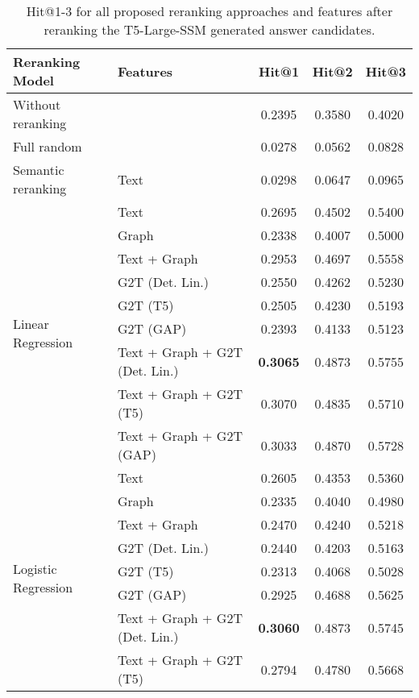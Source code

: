 \begin{table}[htbp]
    \caption{Hit@1-3 for all proposed reranking approaches and features after reranking the T5-Large-SSM generated answer candidates.}
    \label{tab:controllable_fusion:t5_large_ssm_all_results}
    \fontsize{9pt}{11pt}\selectfont
    \centering
    \setlength{\tabcolsep}{3pt}
    \begin{tabular}{l p{5cm} c c c}
        \toprule
        \textbf{Reranking Model} & \textbf{Features} & \textbf{Hit@1} & \textbf{Hit@2} & \textbf{Hit@3} \\
        \midrule
        Without reranking & & 0.2395 & 0.3580 & 0.4020 \\
        \cmidrule(lr){1-5}
        Full random & & 0.0278 & 0.0562 & 0.0828 \\
        \cmidrule(lr){1-5}
        Semantic reranking & Text & 0.0298 & 0.0647 & 0.0965 \\
        \cmidrule(lr){1-5}
        \multirow{9}{*}{Linear Regression} & Text & 0.2695 & 0.4502 & 0.5400 \\
        & Graph & 0.2338 & 0.4007 & 0.5000 \\
        & Text + Graph & 0.2953 & 0.4697 & 0.5558 \\
        & G2T (Det. Lin.) & 0.2550 & 0.4262 & 0.5230 \\
        & G2T (T5) & 0.2505 & 0.4230 & 0.5193 \\
        & G2T (GAP) & 0.2393 & 0.4133 & 0.5123 \\
        & Text + Graph + G2T (Det. Lin.) & \textbf{0.3065} & 0.4873 & 0.5755 \\
        & Text + Graph + G2T (T5) & 0.3070 & 0.4835 & 0.5710 \\
        & Text + Graph + G2T (GAP) & 0.3033 & 0.4870 & 0.5728 \\
        \midrule
        \multirow{12}{*}{Logistic Regression} & Text & 0.2605 & 0.4353 & 0.5360 \\
        & Graph & 0.2335 & 0.4040 & 0.4980 \\
        & Text + Graph & 0.2470 & 0.4240 & 0.5218 \\
        & G2T (Det. Lin.) & 0.2440 & 0.4203 & 0.5163 \\
        & G2T (T5) & 0.2313 & 0.4068 & 0.5028 \\
        & G2T (GAP) & 0.2925 & 0.4688 & 0.5625 \\
        & Text + Graph + G2T (Det. Lin.) & \textbf{0.3060} & 0.4873 & 0.5745 \\
        & Text + Graph + G2T (T5) & 0.2794 & 0.4780 & 0.5668 \\

\end{tabular}
\end{table}

